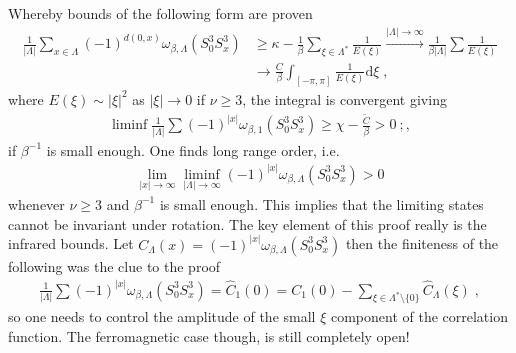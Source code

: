 \documentclass[
a4paper, %
11pt, %
onecolumn, %
openany, %
]{memoir}
\theoremstyle{definition}
\theoremstyle{remark}
\theoremstyle{plain}
\begin{document}
Whereby bounds of the following form are proven \begin{align}
\frac{1}{|\Lambda|}\sum_{x\in\Lambda}(-1)^{d(0,x)}\omega_{\beta,\Lambda}(S_0^3S_x^3)&\geq \kappa - \frac{1}{\beta }\sum_{\xi\in\Lambda^*}\frac{1}{E(\xi)}\overset{|\Lambda|\rightarrow\infty}{\longrightarrow}\frac{1}{\beta|\Lambda|}\sum\frac{1}{E(\xi)}\\&\rightarrow \frac{C}{\beta} \int_{[-\pi,\pi]}\frac{1}{E(\xi)}\mathrm{d}\xi\; ,
\end{align}
where $E(\xi)\sim |\xi|^2$ as $|\xi|\rightarrow 0$ if $\nu\geq 3$, the integral is convergent giving \begin{align}
\liminf \frac{1}{|\Lambda|}\sum(-1)^{|x|}\omega_{\beta,1}(S_0^3S_x^3)\geq \chi - \frac{\tilde{C}}{\beta}> 0\ ;, 
\end{align} 
if $\beta^{-1}$ is small enough. One finds long range order, i.e. \begin{align}\lim_{|x|\rightarrow\infty}\liminf_{|\Lambda|\rightarrow\infty} (-1)^{|x|}\omega_{\beta,\Lambda}(S_0^3S_x^3)>0\end{align}whenever $\nu\geq 3$ and $\beta^{-1}$ is small enough. This implies that the limiting states cannot be invariant under rotation. The key element of this proof really is the infrared bounds. Let $C_{\Lambda}(x)=(-1)^{|x|}\omega_{\beta,\Lambda}(S_0^3S_x^3)$ then the finiteness of the following was the clue to the proof \begin{align}
\frac{1}{|\Lambda|}\sum (-1)^{|x|}\omega_{\beta,\Lambda}(S_0^3S_x^3)=\hat{C}_1(0)=C_1(0)-\sum_{\xi\in\Lambda^*\setminus\{0\}}\hat{C}_{\Lambda}(\xi)\; ,
\end{align}
so one needs to control the amplitude of the small $\xi$ component of the correlation function. The ferromagnetic case though, is still completely open!
\backmatter
\end{document}
